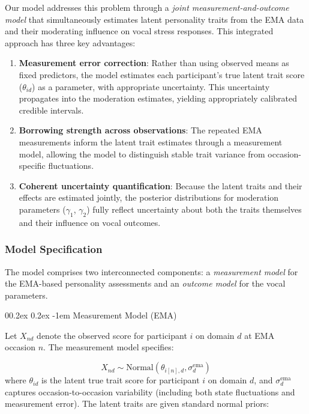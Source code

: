\documentclass[
  english,
  man,floatsintext]{apa6}
\makeatletter
\let\oldparagraph\paragraph
\renewcommand{\paragraph}{
    \@ifstar
      \xxxParagraphStar
      \xxxParagraphNoStar
  }
\newcommand{\xxxParagraphStar}[1]{\oldparagraph*{#1}\mbox{}}
\newcommand{\xxxParagraphNoStar}[1]{\oldparagraph{#1}\mbox{}}
\renewcommand{\paragraph}{\@startsection{paragraph}{4}{\parindent}%
  {0\baselineskip \@plus 0.2ex \@minus 0.2ex}%
  {-1em}%
  {\normalfont\normalsize\bfseries\itshape\typesectitle}}
\makeatother
\begin{document}
Our model addresses this problem through a \emph{joint measurement-and-outcome model} that simultaneously estimates latent personality traits from the EMA data and their moderating influence on vocal stress responses. This integrated approach has three key advantages:

\begin{enumerate}
\def\labelenumi{\arabic{enumi}.}
\item
  \textbf{Measurement error correction}: Rather than using observed means as fixed predictors, the model estimates each participant's true latent trait score (\(\theta_{id}\)) as a parameter, with appropriate uncertainty. This uncertainty propagates into the moderation estimates, yielding appropriately calibrated credible intervals.
\item
  \textbf{Borrowing strength across observations}: The repeated EMA measurements inform the latent trait estimates through a measurement model, allowing the model to distinguish stable trait variance from occasion-specific fluctuations.
\item
  \textbf{Coherent uncertainty quantification}: Because the latent traits and their effects are estimated jointly, the posterior distributions for moderation parameters (\(\gamma_1\), \(\gamma_2\)) fully reflect uncertainty about both the traits themselves and their influence on vocal outcomes.
\end{enumerate}

\subsubsection{Model Specification}\label{model-specification-1}

The model comprises two interconnected components: a \emph{measurement model} for the EMA-based personality assessments and an \emph{outcome model} for the vocal parameters.

\paragraph{Measurement Model (EMA)}\label{measurement-model-ema}

Let \(X_{nd}\) denote the observed score for participant \(i\) on domain \(d\) at EMA occasion \(n\). The measurement model specifies:

\[
X_{nd} \sim \text{Normal}(\theta_{i[n],d}, \sigma_d^{\text{ema}})
\]
where \(\theta_{id}\) is the latent true trait score for participant \(i\) on domain \(d\), and \(\sigma_d^{\text{ema}}\) captures occasion-to-occasion variability (including both state fluctuations and measurement error). The latent traits are given standard normal priors:
\end{document}
